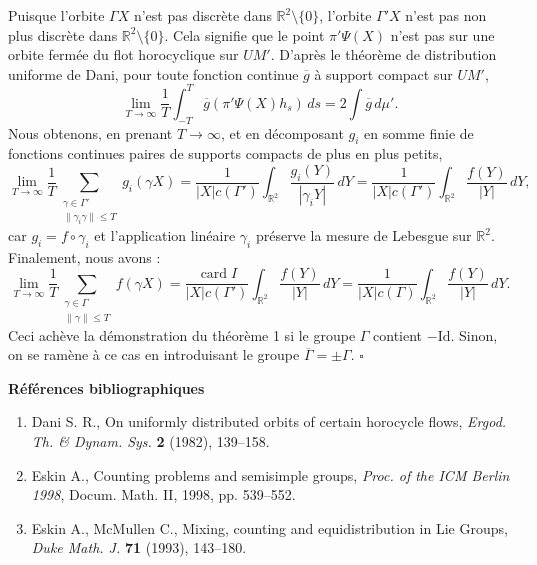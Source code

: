 \documentclass[11pt]{article}
\theoremstyle{remark}
\newcommand{\R}{\mathbb{R}}
\newcommand{\Id}{\mathrm{Id}}
\newcommand{\card}{\operatorname{card}}
\begin{document}
Puisque l'orbite $\Gamma X$ n'est pas discrète dans $\R^2\setminus\{0\}$, l'orbite $\Gamma'X$ n'est pas non plus discrète dans $\R^2\setminus\{0\}$. Cela signifie que le point $\pi'\Psi(X)$ n'est pas sur une orbite fermée du flot horocyclique sur $UM'$. D'après le théorème de distribution uniforme de Dani, pour toute fonction continue $\overline g$ à support compact sur $UM'$,
\[
\lim_{T\to\infty}\frac1T\int_{-T}^{T}\overline g(\pi'\Psi(X)h_s)\,ds
=2\int \overline g\,d\mu'.
\]
Nous obtenons, en prenant $T\to\infty$, et en décomposant $g_i$ en somme finie de fonctions continues paires de supports compacts de plus en plus petits,
\[
\lim_{T\to\infty}\frac1T
\sum_{\substack{\gamma\in\Gamma'\\ \|\gamma_i\gamma\|\le T}}g_i(\gamma X)
=\frac{1}{|X|c(\Gamma')}\int_{\R^2}\frac{g_i(Y)}{|\gamma_iY|}\,dY
=\frac{1}{|X|c(\Gamma')}\int_{\R^2}\frac{f(Y)}{|Y|}\,dY,
\]
car $g_i=f\circ\gamma_i$ et l'application linéaire $\gamma_i$ préserve la mesure de Lebesgue sur $\R^2$. Finalement, nous avons :
\[
\lim_{T\to\infty}\frac1T
\sum_{\substack{\gamma\in\Gamma\\ \|\gamma\|\le T}}f(\gamma X)
=\frac{\card I}{|X|c(\Gamma')}\int_{\R^2}\frac{f(Y)}{|Y|}\,dY
=\frac{1}{|X|c(\Gamma)}\int_{\R^2}\frac{f(Y)}{|Y|}\,dY.
\]
Ceci achève la démonstration du théorème 1 si le groupe $\Gamma$ contient $-\Id$. Sinon, on se ramène à ce cas en introduisant le groupe $\overline\Gamma=\pm\Gamma$.
\hfill$\square$

\begin{center}
\textbf{Références bibliographiques}
\end{center}

\begin{enumerate}
\item Dani S. R., On uniformly distributed orbits of certain horocycle flows, \emph{Ergod. Th. \& Dynam. Sys.} \textbf{2} (1982), 139--158.
\item Eskin A., Counting problems and semisimple groups, \emph{Proc. of the ICM Berlin 1998}, Docum. Math. II, 1998, pp. 539--552.
\item Eskin A., McMullen C., Mixing, counting and equidistribution in Lie Groups, \emph{Duke Math. J.} \textbf{71} (1993), 143--180.
\end{enumerate}
\end{document}
